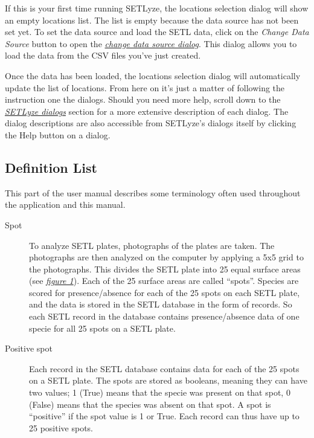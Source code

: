 \documentclass[letterpaper,10pt,english]{sphinxmanual}
\begin{document}
If this is your first time running SETLyze, the locations selection
dialog will show an empty locations list. The list is empty because the
data source has not been set yet. To set the data source and load the
SETL data, click on the \emph{Change Data Source} button to open the
{\hyperref[user_manual:dialog-change-data-source]{\emph{change data source dialog}}}. This
dialog allows you to load the data from the CSV files you've just
created.

Once the data has been loaded, the locations selection dialog will
automatically update the list of locations. From here on it's just a
matter of following the instruction one the dialogs. Should you need
more help, scroll down to the {\hyperref[user_manual:setlyze-dialogs]{\emph{SETLyze dialogs}}}
section for a more extensive description of each dialog. The dialog
descriptions are also accessible from SETLyze's dialogs itself by
clicking the Help button on a dialog.


\subsection{Definition List}
\label{user_manual:definition-list}
This part of the user manual describes some terminology often used
throughout the application and this manual.
\begin{description}
\item[{Spot}] \leavevmode
To analyze SETL plates, photographs of the plates are taken. The
photographs are then analyzed on the computer by applying a 5x5
grid to the photographs. This divides the SETL plate into 25 equal
surface areas (see {\hyperref[user_manual:fig-plate-with-grid]{\emph{figure 1}}}). Each
of the 25 surface areas are called ``spots''. Species are scored for
presence/absence for each of the 25 spots on each SETL plate, and the
data is stored in the SETL database in the form of records. So each
SETL record in the database contains presence/absence data of one
specie for all 25 spots on a SETL plate.

\item[{Positive spot}] \leavevmode
Each record in the SETL database contains data for each of the 25
spots on a SETL plate. The spots are stored as booleans, meaning
they can have two values; 1 (True) means that the specie was present
on that spot, 0 (False) means that the species was absent on
that spot. A spot is ``positive'' if the spot value is 1 or True. Each
record can thus have up to 25 positive spots.

\end{description}
\end{document}
